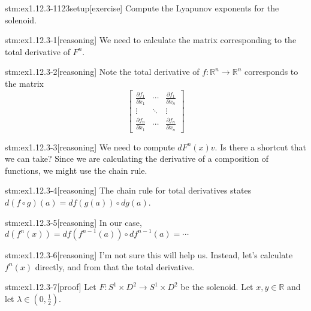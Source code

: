 
\begin{stm}{stm:ex1.12.3-1123setup}[exercise]
Compute the Lyapunov exponents for the solenoid.
\end{stm}


\begin{stm}{stm:ex1.12.3-1}[reasoning]
We need to calculate the matrix corresponding to the total derivative of $F^n$.
\end{stm}

\begin{stm}{stm:ex1.12.3-2}[reasoning]
Note the total derivative of $f \colon \mathbb{R}^n \to \mathbb{R}^n$ corresponds to the matrix
\[
\left[
\begin{array}{ccc}
\frac{\partial f_1}{\partial x_1} & \cdots & \frac{\partial f_1}{\partial x_n} \\
\vdots & \ddots & \vdots \\
\frac{\partial f_n}{\partial x_1} & \cdots & \frac{\partial f_n}{\partial x_n}
\end{array}
\right]
\]
\end{stm}

\begin{stm}{stm:ex1.12.3-3}[reasoning]
We need to compute $dF^n(x)v$. Is there a shortcut that we can take? Since we are calculating the derivative of a composition of functions, we might use the chain rule.
\end{stm}

\begin{stm}{stm:ex1.12.3-4}[reasoning]
The chain rule for total derivatives states $d(f \circ g)(a) = df(g(a)) \circ dg(a)$.
\end{stm}

\begin{stm}{stm:ex1.12.3-5}[reasoning]
In our case, $d(f^n(x)) = df(f^{n-1}(a)) \circ df^{n-1}(a) = \cdots$
\end{stm}

\begin{stm}{stm:ex1.12.3-6}[reasoning]
I'm not sure this will help us. Instead, let's calculate $f^n(x)$ directly, and from that the total derivative.
\end{stm}

\begin{stm}{stm:ex1.12.3-7}[proof]
Let $F \colon S^1 \times D^2 \to S^1 \times D^2$ be the solenoid. Let $x, y \in \mathbb{R}$ and let $\lambda \in (0, \frac{1}{2})$.
\end{stm}

